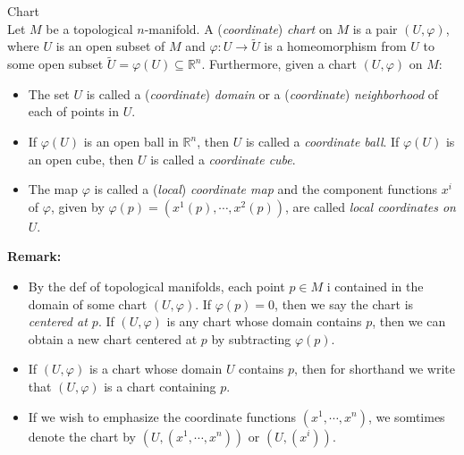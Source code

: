 \begin{definition}{Chart}\\
Let $M$ be a topological $n$-manifold. A (\textit{coordinate}) \textit{chart} on $M$ is a pair $(U,\varphi)$, where $U$ is an open subset of $M$ and $\varphi:U\to \tilde{U}$ is a homeomorphism from $U$ to some open subset $\tilde{U}=\varphi(U) \subseteq \mathbb{R}^n$. Furthermore, given a chart $(U,\varphi)$ on $M$:
\begin{itemize}
    \item The set $U$ is called a (\textit{coordinate}) \textit{domain} or a (\textit{coordinate}) \textit{neighborhood} of each of points in $U$.

    \item If $\varphi(U)$ is an open ball in $\mathbb{R}^n$, then $U$ is called a \textit{coordinate ball}. If $\varphi(U)$ is an open cube, then $U$ is called a \textit{coordinate cube}.

    \item The map $\varphi$ is called a (\textit{local}) \textit{coordinate map} and the component functions $x^i$ of $\varphi$, given by $\varphi(p)= (x^1(p) ,\cdots, x^2(p))$, are called \textit{local coordinates on $U$}.
\end{itemize}
\end{definition}

\noindent\textbf{Remark:} \begin{itemize}
    \item By the def of topological manifolds, each point $p\in M$ i contained in the domain of some chart $(U,\varphi)$. If $\varphi(p)=0$, then we say the chart is \textit{centered at $p$}. If $(U,\varphi)$ is any chart whose domain contains $p$, then we can obtain a new chart centered at $p$ by subtracting $\varphi(p)$.

    \item If $(U,\varphi)$ is a chart whose domain $U$ contains $p$, then for shorthand we write that $(U,\varphi)$ is a chart containing $p$.

    \item If we wish to emphasize the coordinate functions $(x^1,\cdots, x^n)$, we somtimes denote the chart by $(U,(x^1,\cdots,x^n))$ or $(U,(x^i))$.
\end{itemize}


